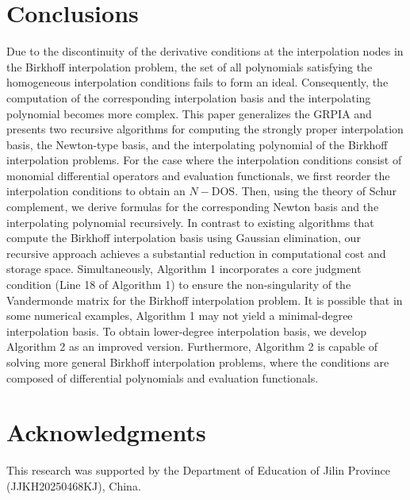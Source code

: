\documentclass[preprint,12pt]{elsarticle}
\begin{document}
\section{Conclusions}\label{sec5}
Due to the discontinuity of the derivative conditions at the interpolation nodes in the Birkhoff interpolation problem, the set of all polynomials satisfying the homogeneous interpolation conditions fails to form an ideal.
Consequently, the computation of the corresponding interpolation basis and the interpolating polynomial becomes more complex.
This paper generalizes the GRPIA and presents two recursive algorithms for computing the strongly proper interpolation basis, the Newton-type basis, and the interpolating polynomial of the Birkhoff interpolation problems. 
For the case where the interpolation conditions consist of monomial differential operators and evaluation functionals, we first reorder the interpolation conditions to obtain an $N-$DOS. 
Then, using the theory of Schur complement, we derive formulas for the corresponding Newton basis and the interpolating polynomial recursively. 
In contrast to existing algorithms that compute the Birkhoff interpolation basis using Gaussian elimination, our recursive approach achieves a substantial reduction in computational cost and storage space.
Simultaneously, Algorithm 1 incorporates a core judgment condition (Line 18 of Algorithm 1) to ensure the non-singularity of the Vandermonde matrix for the Birkhoff interpolation problem. It is possible that in some numerical examples, Algorithm 1 may not yield a minimal-degree interpolation basis.
To obtain lower-degree interpolation basis, we develop Algorithm 2 as an improved version.
Furthermore, Algorithm 2 is capable of solving more general Birkhoff interpolation problems, where the conditions are composed of differential polynomials and evaluation functionals.
\section*{Acknowledgments}
This research was supported by the Department of Education of Jilin Province (JJKH20250468KJ), China.
\end{document}
